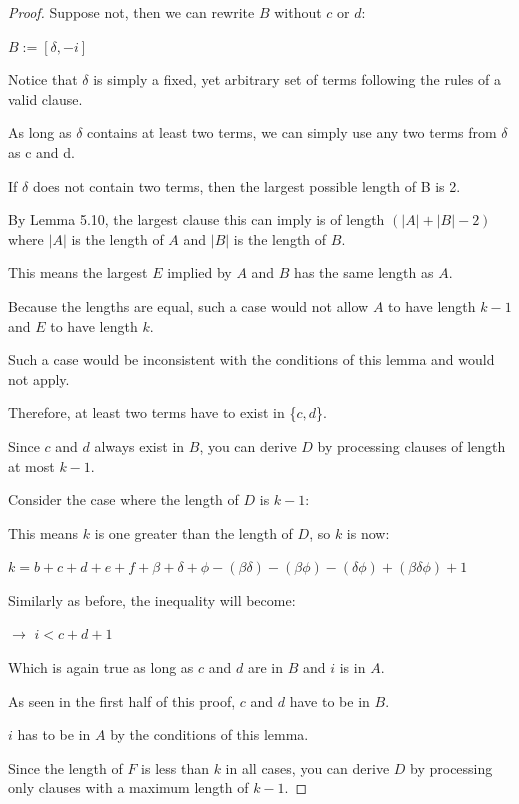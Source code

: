 \documentclass[manuscript]{acmart}
\begin{document}
\begin{proof}
        Suppose not, then we can rewrite $B$ without $c$ or $d$:

        $B := [\delta, -i]$

        Notice that $\delta$ is simply a fixed, yet arbitrary set of terms
        following the rules of a valid clause.

        As long as $\delta$ contains at least two terms, we can simply use 
        any two terms from $\delta$ as c and d.

        If $\delta$ does not contain two terms, then the largest possible
        length of B is 2.
        
        By Lemma 5.10, the largest clause this can imply is of length 
        $(|A| + |B| - 2)$ where $|A|$ is the length of $A$ and $|B|$ is the length 
        of $B$.

        This means the largest $E$ implied by $A$ and $B$ has the same 
        length as $A$.

        Because the lengths are equal, such a case would not allow $A$ to 
        have length $k - 1$ and $E$ to have length $k$.

        Such a case would be inconsistent with the conditions of this 
        lemma and would not apply.
        
        Therefore, at least two terms have to exist in \{$c, d$\}.

        Since $c$ and $d$ always exist in $B$, you can derive $D$ by processing
        clauses of length at most $k-1$.
    
        Consider the case where the length of $D$ is $k - 1$:

        This means $k$ is one greater than the length of $D$, so $k$ is now:

        $k = b + c + d + e + f + \beta + \delta + \phi - (\beta \delta) - 
        (\beta \phi) - (\delta \phi) + (\beta \delta \phi) + 1$

        Similarly as before, the inequality will become:

        $\rightarrow$ $i < c + d + 1$

        Which is again true as long as $c$ and $d$ are in $B$ and $i$ is in $A$.

        As seen in the first half of this proof, $c$ and $d$ have to be in
        $B$.

        $i$ has to be in $A$ by the conditions of this lemma.

        Since the length of $F$ is less than $k$ in all cases, you can derive
        $D$ by processing only clauses with a maximum length of $k-1$.
    \end{proof}
\end{document}
